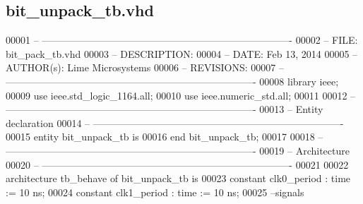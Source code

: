 \subsection{bit\+\_\+unpack\+\_\+tb.\+vhd}
\label{bit__unpack__tb_8vhd_source}

\begin{DoxyCode}
00001 \textcolor{keyword}{-- ---------------------------------------------------------------------------- }
00002 \textcolor{keyword}{-- FILE:    bit\_pack\_tb.vhd}
00003 \textcolor{keyword}{-- DESCRIPTION: }
00004 \textcolor{keyword}{-- DATE:    Feb 13, 2014}
00005 \textcolor{keyword}{-- AUTHOR(s):   Lime Microsystems}
00006 \textcolor{keyword}{-- REVISIONS:}
00007 \textcolor{keyword}{-- ---------------------------------------------------------------------------- }
00008 \textcolor{vhdlkeyword}{library }\textcolor{keywordflow}{ieee};
00009 \textcolor{vhdlkeyword}{use }ieee.std\_logic\_1164.\textcolor{keywordflow}{all};
00010 \textcolor{vhdlkeyword}{use }ieee.numeric\_std.\textcolor{keywordflow}{all};
00011 
00012 \textcolor{keyword}{-- ----------------------------------------------------------------------------}
00013 \textcolor{keyword}{-- Entity declaration}
00014 \textcolor{keyword}{-- ----------------------------------------------------------------------------}
00015 \textcolor{keywordflow}{entity }bit_unpack_tb \textcolor{keywordflow}{is}
00016 \textcolor{keywordflow}{end} \textcolor{vhdlchar}{bit\_unpack\_tb};
00017 
00018 \textcolor{keyword}{-- ----------------------------------------------------------------------------}
00019 \textcolor{keyword}{-- Architecture}
00020 \textcolor{keyword}{-- ----------------------------------------------------------------------------}
00021 
00022 \textcolor{keywordflow}{architecture} tb\_behave \textcolor{keywordflow}{of} bit_unpack_tb is
00023    \textcolor{keywordflow}{constant} \textcolor{vhdlchar}{clk0_period}   \textcolor{vhdlchar}{:} \textcolor{comment}{time} \textcolor{vhdlchar}{:=} \textcolor{vhdllogic}{}\textcolor{vhdllogic}{10} \textcolor{vhdlchar}{ns};
00024    \textcolor{keywordflow}{constant} \textcolor{vhdlchar}{clk1_period}   \textcolor{vhdlchar}{:} \textcolor{comment}{time} \textcolor{vhdlchar}{:=} \textcolor{vhdllogic}{}\textcolor{vhdllogic}{10} \textcolor{vhdlchar}{ns}; 
00025 \textcolor{keyword}{   --signals}

\end{DoxyCode}
